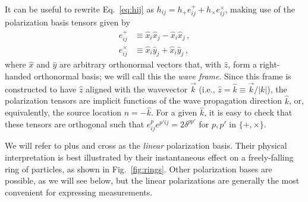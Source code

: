 \documentclass[aps,prd,twocolumn,superscriptaddress,preprintnumbers,floatfix,nofootinbib]{revtex4-2}
\newcommand*{\eq}[1]{Eq.~\eqref{eq:#1}}
\begin{document}
It can be useful to rewrite \eq{hij} as $h_{ij} = h_+ e^+_{ij} + h_\times e^\times_{ij}$, making use of the polarization basis tensors given by
\begin{subequations} \label{eq:lin}
\begin{align}
e^+_{ij} &\equiv \hat{x}_i \hat{x}_j - \hat{x}_i \hat{x}_j \, ,\\
e^\times_{ij} &\equiv \hat{x}_i \hat{y}_j + \hat{x}_i \hat{y}_j\, ,
\end{align}
\end{subequations}
where $\hat{x}$ and $\hat{y}$ are arbitrary orthonormal vectors that, with $\hat{z}$, form a right-handed orthonormal basis; we will call this the \emph{wave frame}.
Since this frame is constructed to have $\hat{z}$ aligned with the wavevector $\vec{k}$ (i.e., $\hat{z} = \hat{k} \equiv \vec{k}/|k|$), the polarization tensors are implicit functions of the wave propagation direction $\hat{k}$, or, equivalently, the source location $\hat{n} = -\hat{k}$.
For a given $\hat{k}$, it is easy to check that these tensors are orthogonal such that $e^p_{ij} e^{p'ij}=2\delta^{pp'}$ for $p,p'$ in $\{+,\times\}$.

We will refer to plus and cross as the \emph{linear} polarization basis.
Their physical interpretation is best illustrated by their instantaneous effect on a freely-falling ring of particles, as shown in Fig.~\ref{fig:rings}.
Other polarization bases are possible, as we will see below, but the linear polarizations are generally the most convenient for expressing measurements.
\end{document}
